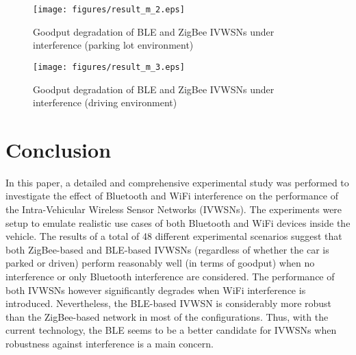 \documentclass[journal]{IEEEtran}
\begin{document}
\begin{figure}[tbp]
\centering
\texttt{[image: figures/result\_m\_2.eps]}
\caption{Goodput degradation of BLE and ZigBee IVWSNs under interference (parking lot environment)}
\label{result_2}
\end{figure}

\begin{figure}[tbp]
\centering
\texttt{[image: figures/result\_m\_3.eps]}
\caption{Goodput degradation of BLE and ZigBee IVWSNs under interference (driving environment)}
\label{result_3}
\end{figure}




























\section{Conclusion}


In this paper, a detailed and comprehensive experimental study was performed to investigate the effect of Bluetooth and WiFi interference on the performance of the Intra-Vehicular Wireless Sensor Networks (IVWSNs). The experiments were setup to emulate realistic use cases of both Bluetooth and WiFi devices inside the vehicle. The results of a total of 48 different experimental scenarios suggest that both ZigBee-based and BLE-based IVWSNs (regardless of whether the car is parked or driven) perform reasonably well (in terms of goodput) when no interference or only Bluetooth interference are considered. The performance of both IVWSNs however significantly degrades when WiFi interference is introduced. Nevertheless, the BLE-based IVWSN is considerably more robust than the ZigBee-based network in most of the configurations. Thus, with the current technology, the BLE seems to be a better candidate for IVWSNs when robustness against interference is a main concern. 





\ifCLASSOPTIONcaptionsoff
  \newpage
\fi

\linespread{0.85}


\end{document}
